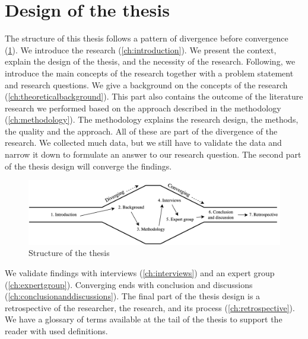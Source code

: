 \section{Design of the thesis}
\label{sec:structure}
The structure of this thesis follows a pattern of divergence before convergence (\cref{fig:design}). We introduce the research (\cref{ch:introduction}). We present the context, explain the design of the thesis, and the necessity of the research. Following, we introduce the main concepts of the research together with a problem statement and research questions. We give a background on the concepts of the research (\cref{ch:theoreticalbackground}). This part also contains the outcome of the literature research we performed based on the approach described in the methodology (\cref{ch:methodology}). The methodology explains the research design, the methods, the quality and the approach. All of these are part of the divergence of the research. We collected much data, but we still have to validate the data and narrow it down to formulate an answer to our research question. The second part of the thesis design will converge the findings.
\begin{figure}[H]
	\centering
	\includegraphics[width=0.9\linewidth]{images/structure}
	\caption[Design of the thesis]{Structure of the thesis}
	\label{fig:design}
\end{figure}
We validate findings with interviews (\cref{ch:interviews}) and an expert group (\cref{ch:expertgroup}). Converging ends with  conclusion and discussions (\cref{ch:conclusionanddiscussions}). The final part of the thesis design is a retrospective of the researcher, the research, and its process (\cref{ch:retrospective}). We have a glossary of terms available at the tail of the thesis to support the reader with used definitions.
